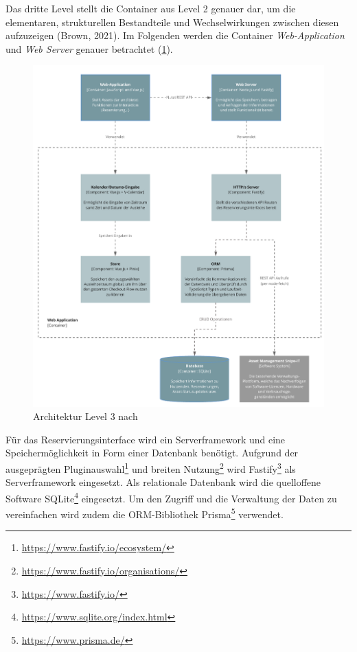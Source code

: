 {\sffamily\color{maincolor}{Level 3: Components}}

Das dritte Level stellt die Container aus Level 2 genauer dar, um die elementaren, strukturellen
Bestandteile und Wechselwirkungen zwischen diesen aufzuzeigen (Brown, 2021). Im Folgenden werden die
Container \textit{Web-Application} und \textit{Web Server} genauer betrachtet (\ref{fig:level3}).

\begin{figure}[h]
    \centering
    \includegraphics[scale=0.9]{Bilder/level3.pdf}
    \caption[Architektur Level 3]{Architektur Level 3 nach }
    \label{fig:level3}
\end{figure}

Für das Reservierungsinterface wird ein Serverframework und eine Speichermöglichkeit in Form einer
Datenbank benötigt. Aufgrund der ausgeprägten
Pluginauswahl\footnote{\url{https://www.fastify.io/ecosystem/}} und breiten
Nutzung\footnote{\url{https://www.fastify.io/organisations/}} wird
Fastify\footnote{\url{https://www.fastify.io/}} als Serverframework eingesetzt. Als relationale
Datenbank wird die quelloffene Software SQLite\footnote{\url{https://www.sqlite.org/index.html}}
eingesetzt. Um den Zugriff und die Verwaltung der Daten zu vereinfachen wird zudem die
ORM-Bibliothek Prisma\footnote{\url{https://www.prisma.de/}}  verwendet.



